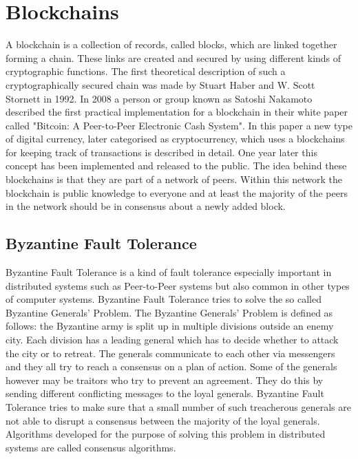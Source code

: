 \section{Blockchains}

A blockchain is a collection of records, called blocks, which are linked together forming a chain. These links are created and secured by using different kinds of cryptographic functions.
The first theoretical description of such a cryptographically secured chain was made by Stuart Haber and W. Scott Stornett in 1992.\cite{book:haber} In 2008 a person or group known as Satoshi Nakamoto
described the first practical implementation for a blockchain in their white paper called "Bitcoin: A Peer-to-Peer Electronic Cash System".\cite{url:bitcoin} In this paper a new type of digital
currency, later categorised as cryptocurrency, which uses a blockchains for keeping track of transactions is described in detail. One year later this concept has been implemented and released to the
public. The idea behind these blockchains is that they are part of a network of peers. Within this network the blockchain is public knowledge to everyone and at least the majority of the peers in the
network should be in consensus about a newly added block.

\subsection{Byzantine Fault Tolerance}

Byzantine Fault Tolerance is a kind of fault tolerance especially important in distributed systems such as Peer-to-Peer systems but also common in other types of computer systems.
Byzantine Fault Tolerance tries to solve the so called Byzantine Generals' Problem. The Byzantine Generals' Problem is defined as follows: the Byzantine army is split up in multiple divisions 
outside an enemy city. Each division has a leading general which has to decide whether to attack the city or to retreat. The generals communicate to each other via messengers and they all try to
reach a consensus on a plan of action. Some of the generals however may be traitors who try to prevent an agreement. They do this by sending different conflicting messages to the loyal generals. 
Byzantine Fault Tolerance tries to make sure that a small number of such treacherous generals are not able to disrupt a consensus between the majority of the loyal generals.\cite{url:byzantine_general}
Algorithms developed for the purpose of solving this problem in distributed systems are called consensus algorithms.

